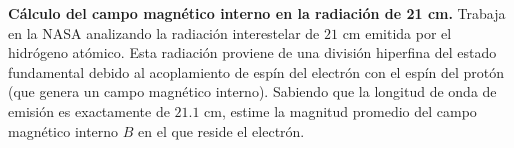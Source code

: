 \item \textbf{Cálculo del campo magnético interno en la radiación de 21 cm.}
Trabaja en la NASA analizando la radiación interestelar de $21\text{ cm}$ emitida por el hidrógeno atómico. Esta radiación proviene de una división hiperfina del estado fundamental debido al acoplamiento de espín del electrón con el espín del protón (que genera un campo magnético interno). Sabiendo que la longitud de onda de emisión es exactamente de $21.1\text{ cm}$, estime la magnitud promedio del campo magnético interno $B$ en el que reside el electrón.